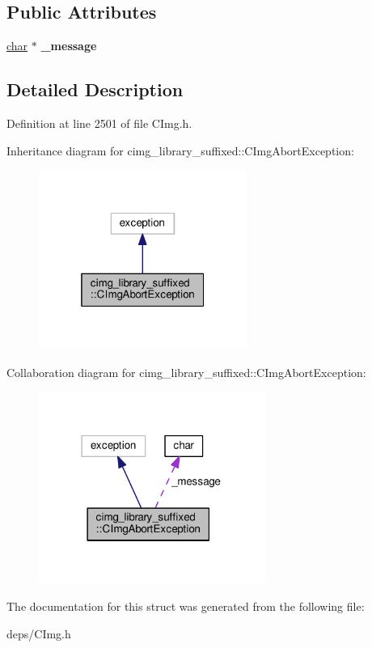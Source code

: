 \subsection*{Public Attributes}
\begin{DoxyCompactItemize}
\item 
\mbox{\label{structcimg__library__suffixed_1_1CImgAbortException_a643797a017b6fa95e29c494eca5089a3}} 
\hyperlink{classchar}{char} $\ast$ {\bfseries \+\_\+message}
\end{DoxyCompactItemize}


\subsection{Detailed Description}


Definition at line 2501 of file C\+Img.\+h.



Inheritance diagram for cimg\+\_\+library\+\_\+suffixed\+:\+:C\+Img\+Abort\+Exception\+:
\nopagebreak
\begin{figure}[H]
\begin{center}
\leavevmode
\includegraphics[width=193pt]{d2/dc9/structcimg__library__suffixed_1_1CImgAbortException__inherit__graph}
\end{center}
\end{figure}


Collaboration diagram for cimg\+\_\+library\+\_\+suffixed\+:\+:C\+Img\+Abort\+Exception\+:
\nopagebreak
\begin{figure}[H]
\begin{center}
\leavevmode
\includegraphics[width=210pt]{d4/dd9/structcimg__library__suffixed_1_1CImgAbortException__coll__graph}
\end{center}
\end{figure}


The documentation for this struct was generated from the following file\+:\begin{DoxyCompactItemize}
\item 
deps/C\+Img.\+h\end{DoxyCompactItemize}
